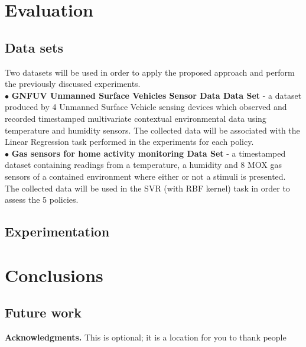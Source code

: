 \documentclass{mpaper}
\begin{document}
\section{Evaluation}

\subsection*{Data sets}
Two datasets will be used in order to apply the proposed approach and perform the previously discussed experiments.
\\$\bullet$ \textbf{GNFUV Unmanned Surface Vehicles Sensor Data Data Set} \cite{harth2018} - a dataset produced by 4 Unmanned Surface Vehicle sensing devices which observed and recorded timestamped multivariate contextual environmental data using temperature and humidity sensors. The collected data will be associated with the Linear Regression task performed in the experiments for each policy.
\\$\bullet$ \textbf{Gas sensors for home activity monitoring Data Set } \cite{HUERTA2016169} - a timestamped dataset containing readings from a temperature, a humidity and 8 MOX gas sensors of a contained environment where either or not a stimuli is presented. The collected data will be used in the SVR (with RBF kernel) task in order to assess the 5 policies.
\subsection{Experimentation}

\section{Conclusions}

\subsection*{Future work}

{\bf Acknowledgments.}
This is optional; it is a location for you to thank people



\end{document}
